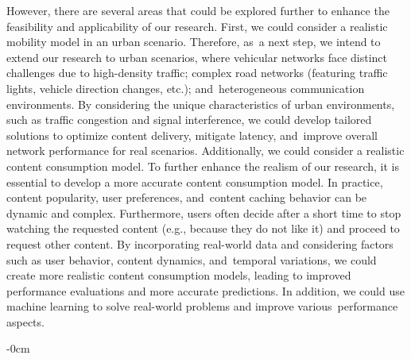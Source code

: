 \documentclass[sensors,aricle,accept,pdftex,moreauthors]{Definitions/mdpi}
\begin{document}
{However, there are several areas that could be explored further to enhance the feasibility and applicability of our research.
First, we could consider a realistic mobility model in an urban scenario.
Therefore, as~a next step, we intend to extend our research to urban scenarios, where vehicular networks face distinct challenges due to high-density traffic; complex road networks (featuring traffic lights, vehicle direction changes, etc.); and~heterogeneous communication environments.
By considering the unique characteristics of urban environments, such as traffic congestion and signal interference, we could develop tailored solutions to optimize content delivery, mitigate latency, and~improve overall network performance for real scenarios.
Additionally, we could consider a realistic content consumption model.
To further enhance the realism of our research, it is essential to develop a more accurate content consumption model.
In practice, content popularity, user preferences, and~content caching behavior can be dynamic and complex.
Furthermore, users often decide after a short time to stop watching the requested content (e.g., because they do not like it) and proceed to request other content.
By incorporating real-world data and considering factors such as user behavior, content dynamics, and~temporal variations, we could create more realistic content consumption models, leading to improved performance evaluations and more accurate predictions.
In addition, we could use machine learning to solve real-world problems and improve various~performance aspects.



\vspace{6pt} 


\pagebreak
\begin{adjustwidth}{-\extralength}{0cm}


\end{adjustwidth}}
\end{document}
